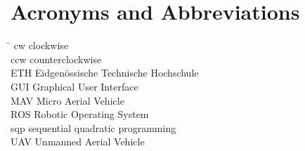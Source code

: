 
\section*{Acronyms and Abbreviations}
\begin{tabbing}
 \hspace*{1.6cm}  \= \kill
 cw\> clockwise \\[0.5ex]
 ccw\> counterclockwise \\[0.5ex]
 ETH \> Eidgenössische Technische Hochschule \\[0.5ex]
 GUI \> Graphical User Interface \\[0.5ex]
 MAV \> Micro Aerial Vehicle \\[0.5ex]
 ROS \> Robotic Operating System \\[0.5ex]
 sqp \> sequential quadratic programming \\[0.5ex]
 UAV \> Unmanned Aerial Vehicle \\[0.5ex]
\end{tabbing}
